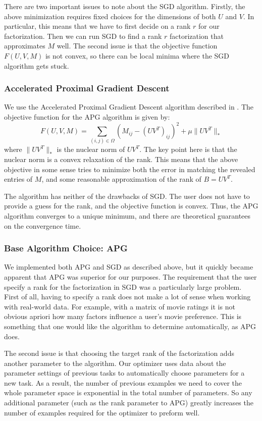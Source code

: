 There are two important issues to note about the SGD algorithm. Firstly, the above minimization requires fixed choices for the dimensions of both $U$ and $V$. In particular, this means that we have to first decide on a rank $r$ for our factorization. Then we can run SGD to find a rank $r$ factorization that approximates $M$ well. The second issue is that the objective function $F(U,V,M)$ is not convex, so there can be local minima where the SGD algorithm gets stuck.

\subsubsection{Accelerated Proximal Gradient Descent}
We use the Accelerated Proximal Gradient Descent algorithm described in \cite{TY10}. The objective function for the APG algorithm is given by:
\[
F(U,V,M) = \sum_{(i,j)\in \Omega} \left(M_{ij} - (UV^T)_{ij}\right)^2 + \mu \| UV^T\|_*
\]
where $\|UV^T\|_*$ is the nuclear norm of $UV^T$. The key point here is that the nuclear norm is a convex relaxation of the rank. This means that the above objective in some sense tries to minimize both the error in matching the revealed entries of $M$, and some reasonable approximation of the rank of $B=UV^T$.

The algorithm has neither of the drawbacks of SGD. The user does not have to provide a guess for the rank, and the objective function is convex. Thus, the APG algorithm converges to a unique minimum, and there are theoretical guarantees on the convergence time.

\subsubsection{Base Algorithm Choice: APG}
We implemented both APG and SGD as described above, but it quickly became apparent that APG was superior for our purposes. The requirement that the user specify a rank for the factorization in SGD was a particularly large problem. First of all, having to specify a rank does not make a lot of sense when working with real-world data. For example, with a matrix of movie ratings it is not obvious apriori how many factors influence a user's movie preference. This is something that one would like the algorithm to determine automatically, as APG does.

The second issue is that choosing the target rank of the factorization adds another parameter to the algorithm. Our optimizer uses data about the parameter settings of previous tasks to automatically choose parameters for a new task. As a result, the number of previous examples we need to cover the whole parameter space is exponential in the total number of parameters. So any additional parameter (such as the rank parameter to APG) greatly increases the number of examples required for the optimizer to preform well.

